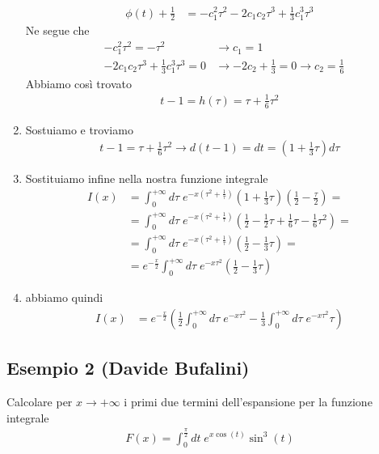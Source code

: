 \begin{enumerate}
\begin{align}
		\phi(t) + \frac{1}{2} &= -c_1^2 \tau^2 - 2c_1c_2 \tau^3 + \frac{1}{3}c_1^3 \tau^3
	\end{align}
	Ne segue che
	\begin{align}
		&-c_1^2 \tau^2 = -\tau^2 &\to c_1 = 1\\
		&-2c_1c_2 \tau^3 + \frac{1}{3}c_1^3 \tau^3=0 &\to -2c_2 + \frac{1}{3} = 0 \to c_2 = \frac{1}{6}
	\end{align}
	Abbiamo così trovato
	\begin{align}
		t-1 = h(\tau) = \tau + \frac{1}{6}\tau^2
	\end{align}
	\item Sostuiamo e troviamo
	\begin{align}
		t-1 = \tau + \frac{1}{6}\tau^2 \to d(t-1) = dt = \left( 1 + \frac{1}{3} \tau \right) d\tau
	\end{align}
	\item Sostituiamo infine nella nostra funzione integrale
	\begin{align}
		I(x) &= \int_{0}^{+\infty} d\tau \; e^{-x \left( \tau^2 + \frac{1}{\tau} \right)} \left( 1 + \frac{1}{3} \tau \right) \left(\frac{1}{2} - \frac{\tau}{2}\right) = \nonumber\\
		&= \int_{0}^{+\infty} d\tau \; e^{-x \left( \tau^2 + \frac{1}{\tau} \right)} \left( \frac{1}{2}- \frac{1}{2}\tau + \frac{1}{6} \tau - \frac{1}{6} \tau^2 \right) = \nonumber\\
		&= \int_{0}^{+\infty} d\tau \; e^{-x \left( \tau^2 + \frac{1}{\tau} \right)} \left( \frac{1}{2} - \frac{1}{3} \tau \right) = \nonumber\\
		&= e^{-\frac{x}{2}}\int_{0}^{+\infty} d\tau \; e^{-x\tau^2} \left( \frac{1}{2} - \frac{1}{3} \tau \right)
	\end{align}
	\item abbiamo quindi
	\begin{align}
		I(x) &= e^{-\frac{x}{2}} \left( \frac{1}{2} \int_{0}^{+\infty} d\tau \; e^{-x\tau^2} - \frac{1}{3} \int_{0}^{+\infty} d\tau \; e^{-x\tau^2}\tau \right)
	\end{align}
\end{enumerate}

\newpage

\subsection{Esempio 2 (Davide Bufalini) \label{es1}}

Calcolare per $x\rightarrow +\infty$ i primi due termini dell'espansione per la funzione integrale
\begin{align}
	F(x) = \int_{0}^{\frac{\pi}{2}} dt \; e^{x\cos(t)}\sin^3(t)
\end{align}

